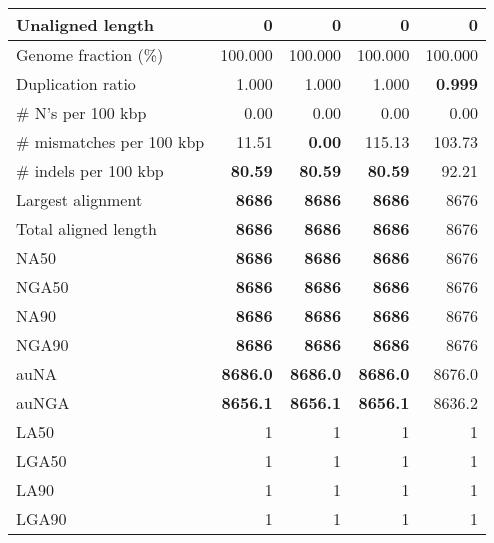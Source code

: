 \documentclass[12pt,a4paper]{article}
\begin{document}
\begin{table}[ht]
\begin{center}
\begin{tabular}{|l*{4}{|r}|}
Unaligned length & 0 & 0 & 0 & 0 \\ \hline
Genome fraction (\%) & 100.000 & 100.000 & 100.000 & 100.000 \\ \hline
Duplication ratio & 1.000 & 1.000 & 1.000 & {\bf 0.999} \\ \hline
\# N's per 100 kbp & 0.00 & 0.00 & 0.00 & 0.00 \\ \hline
\# mismatches per 100 kbp & 11.51 & {\bf 0.00} & 115.13 & 103.73 \\ \hline
\# indels per 100 kbp & {\bf 80.59} & {\bf 80.59} & {\bf 80.59} & 92.21 \\ \hline
Largest alignment & {\bf 8686} & {\bf 8686} & {\bf 8686} & 8676 \\ \hline
Total aligned length & {\bf 8686} & {\bf 8686} & {\bf 8686} & 8676 \\ \hline
NA50 & {\bf 8686} & {\bf 8686} & {\bf 8686} & 8676 \\ \hline
NGA50 & {\bf 8686} & {\bf 8686} & {\bf 8686} & 8676 \\ \hline
NA90 & {\bf 8686} & {\bf 8686} & {\bf 8686} & 8676 \\ \hline
NGA90 & {\bf 8686} & {\bf 8686} & {\bf 8686} & 8676 \\ \hline
auNA & {\bf 8686.0} & {\bf 8686.0} & {\bf 8686.0} & 8676.0 \\ \hline
auNGA & {\bf 8656.1} & {\bf 8656.1} & {\bf 8656.1} & 8636.2 \\ \hline
LA50 & 1 & 1 & 1 & 1 \\ \hline
LGA50 & 1 & 1 & 1 & 1 \\ \hline
LA90 & 1 & 1 & 1 & 1 \\ \hline
LGA90 & 1 & 1 & 1 & 1 \\ \hline
\end{tabular}
\end{center}
\end{table}
\end{document}
